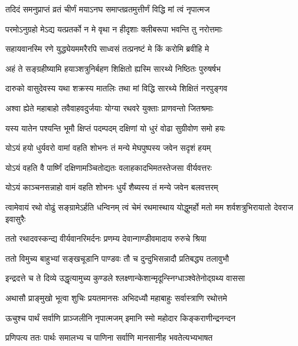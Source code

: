 \twolineshloka
{तदिदं समनुप्राप्तं व्रतं चीर्णं मयाऽनघ}
{समाप्तव्रतमुत्तीर्णं विद्धि मां त्वं नृपात्मज}




\twolineshloka
{परमोऽनुग्रहो मेऽद्य यत्प्रतर्को न मे वृथा}
{न हीदृशाः क्लीबरूपा भवन्ति तु नरोत्तमाः}


\twolineshloka
{सहायवानस्मि रणे युद्ध्येयममरैरपि}
{साध्वसं तत्प्रनष्टं मे किं करोमि ब्रवीहि मे}


\twolineshloka
{अहं ते सङ्ग्रहीष्यामि हयाञ्शत्रुनिर्बहण}
{शिक्षितो ह्यस्मि सारथ्ये निष्ठितः पुरुषर्षभ}


\twolineshloka
{दारुको वासुदेवस्य यथा शक्रस्य मातलिः}
{तथा मां विद्धि सारथ्ये शिक्षितं नरपुङ्गव}


\twolineshloka
{अश्वा ह्येते महाबाहो तवैवाहवदुर्जयाः}
{योग्या रथवरे युक्ताः प्राणवन्तो जितश्रमाः}


\twolineshloka
{यस्य यातेन पश्यन्ति भूमौ क्षिप्तं पदम्पदम्}
{दक्षिणां यो धुरं वोढा सुग्रीवोण समो हयः}


\twolineshloka
{योऽयं हयो धुर्यवरो वामां वहति शोभनः}
{तं मन्ये मेघपुष्पस्य जवेन सदृशं हयम्}


\twolineshloka
{योऽयं वहति वै पार्ष्णिं दक्षिणामञ्चितोद्यतः}
{वलाहकादभिमतस्तेजसा वीर्यवत्तरः}


\twolineshloka
{योऽयं काञ्चनसन्नाहो वामं वहति शोभनः}
{धुर्यं शैब्यस्य तं मन्ये जवेन बलवत्तरम्}


\threelineshloka
{त्वामेवायं रथो वोढुं सङ्ग्रामेऽर्हति धन्विनम्}
{त्वं चेमं रथमास्थाय योद्धुमर्हो मतो मम}
{शर्वशत्रुभिरायातो देवराज इवासुरैः}



\twolineshloka
{ततो रथादवस्कन्द्य वीर्यवानरिमर्दनः}
{प्रणम्य देवान्गाण्डीवमादाय रुरुचे श्रिया}


\twolineshloka
{ततो विमुच्य बाहुभ्यां सङ्खचूडानि पाण्डवः}
{तौ च दुन्दुभिसन्नादौ प्रतिबद्ध्य तलावुभौ}


\twolineshloka
{इन्द्रदत्ते च ते दिव्ये उद्धृत्यामुच्य कुण्डले}
{श्लक्ष्णान्केशान्मृदून्स्निग्धाञ्श्वेतेनोद्ग्रथ्य वाससा}


\twolineshloka
{अथासौ प्राङ्मुखो भूत्वा शुचिः प्रयतमानसः}
{अभिदध्यौ महाबाहुः सर्वास्त्राणि रथोत्तमे}


\twolineshloka
{ऊचुश्च पार्थं सर्वाणि प्राञ्जलीनि नृपात्मजम्}
{इमानि स्मो महोदार किङ्कराणीन्द्रनन्दन}


\twolineshloka
{प्रणिपत्य ततः पार्थः समालभ्य च पाणिना}
{सर्वाणि मानसानीह भवतेत्यभ्यभाषत}


